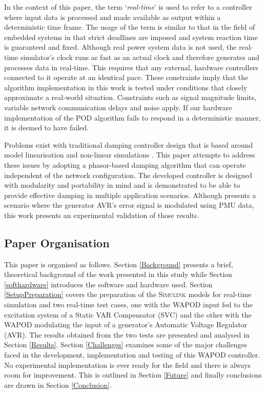 \documentclass[journal]{IEEEtran}
\begin{document}
In the context of this paper, the term `\emph{real-time}' is used to refer to a controller where input data is processed and made available as output within a deterministic time frame. The usage of the term is similar to that in the field of embedded systems in that strict deadlines are imposed and system reaction time is guaranteed and fixed. Although real power system data is not used, the real-time simulator's clock runs as fast as an actual clock and therefore generates and processes data in real-time. This requires that any external, hardware controllers connected to it operate at an identical pace. These constraints imply that the algorithm implementation in this work is tested under conditions that closely approximate a real-world situation. Constraints such as signal magnitude limits, variable network communication delays and noise apply. If our hardware implementation of the POD algorithm fails to respond in a deterministic manner, it is deemed to have failed.\\\vspace{-1em}

Problems exist with traditional damping controller design that is based around model linearisation and non-linear simulations \cite{WAPODChina}. This paper attempts to address these issues by adopting a phasor-based damping algorithm \cite{PhasorPOD} that can operate independent of the network configuration. The developed controller is designed with modularity and portability in mind and is demonstrated to be able to provide effective damping in multiple application scenarios. Although \cite{Yuwa} presents a scenario where the generator AVR\rq{s} error signal is modulated using PMU data, this work presents an experimental validation of those results.

\subsection{Paper Organisation}

This paper is organised as follows. Section \ref{Background} presents a brief, theoretical background of the work presented in this study while Section \ref{softhardware} introduces the software and hardware used. Section \ref{SetupPreparation} covers the preparation of the \textsc{Simulink} models for real-time simulation and two real-time test cases, one with the WAPOD input fed to the excitation system of a Static VAR Compensator (SVC) and the other with the WAPOD modulating the input of a generator\rq{s} Automatic Voltage Regulator (AVR). The results obtained from the two tests are presented and analysed in Section \ref{Results}. Section \ref{Challenges} examines some of the major challenges faced in the development, implementation and testing of this WAPOD controller. No experimental implementation is ever ready for the field and there is always room for improvement. This is outlined in Section \ref{Future} and finally conclusions are drawn in Section \ref{Conclusion}.
\end{document}
